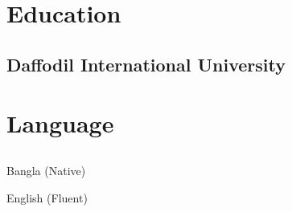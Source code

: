 \documentclass[]{plushcv}
\begin{document}
\begin{minipage}[t]{0.25\textwidth}
\section{Education} 
\subsection{Daffodil International University}
\vspace{2mm}

\sectionsep





\section{Language} 
\subsection{ }
\begin{tightemize}
\item Bangla (Native)
\item English (Fluent)
\end{tightemize}

\sectionsep






\end{minipage} 
\end{document}
